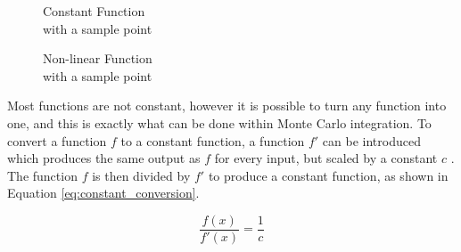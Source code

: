 \documentclass[../dissertation.tex]{subfiles}
\begin{document}
\begin{figure}[h]
\captionsetup{justification=centering}
\centering
\begin{minipage}{.33\textwidth}
    \hspace*{\fill}%
     \caption{Constant Function\\ with a sample point}
  \label{fig:constant_function}
\end{minipage}
\hspace{8em}
\begin{minipage}{.33\textwidth}
    
  \hspace*{\fill}%

  \caption{ Non-linear Function\\ with a sample point}
  \label{fig:non_lin_function}
\end{minipage}
\end{figure}

Most functions are not constant, however it is possible to turn any function into one, and this is exactly what can be done within Monte Carlo integration. To convert a function $f$ to a constant function, a function $f'$ can be introduced which produces the same output as $f$ for every input, but scaled by a constant $c$ \cite{scratchapixel_2015}. The function $f$ is then divided by $f'$ to produce a constant function, as shown in Equation \ref{eq:constant_conversion}.

\begin{equation}
\label{eq:constant_conversion}
\frac{f(x)}{f'(x)} = \frac{1}{c}
\end{equation}
\end{document}
